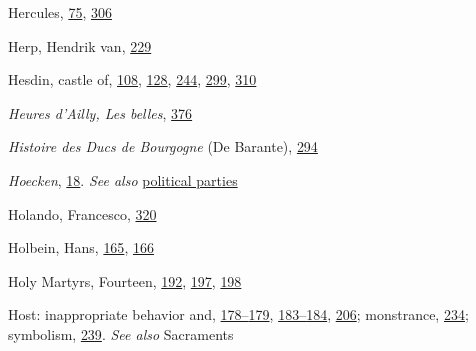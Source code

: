 Hercules,
\protect\hyperlink{10_Chapter_Three__THE_HEROIC_DREAM.xhtmlux5cux23page_75}{75},
\protect\hyperlink{20_ILLUSTRATIONS_FOLLOW_PAGE.xhtmlux5cux23page_306}{306}

Herp, Hendrik van,
\protect\hyperlink{15_Chapter_Eight__RELIGIOUS_EXCITAT.xhtmlux5cux23page_229}{229}

Hesdin, castle of,
\protect\hyperlink{10_Chapter_Three__THE_HEROIC_DREAM.xhtmlux5cux23page_108}{108},
\protect\hyperlink{11_Chapter_Four__THE_FORMS_OF_LOVE.xhtmlux5cux23page_128}{128},
\protect\hyperlink{16_Chapter_Nine__THE_DECLINE_OF_SYM.xhtmlux5cux23page_244}{244},
\protect\hyperlink{20_ILLUSTRATIONS_FOLLOW_PAGE.xhtmlux5cux23page_299}{299},
\protect\hyperlink{20_ILLUSTRATIONS_FOLLOW_PAGE.xhtmlux5cux23page_310}{310}

\emph{Heures d'Ailly, Les belles},
\protect\hyperlink{21_Chapter_Thirteen__IMAGE_AND_WORD.xhtmlux5cux23page_376}{376}

\emph{Histoire des Ducs de Bourgogne} (De Barante),
\protect\hyperlink{19_Chapter_Twelve__ART_IN_LIFE.xhtmlux5cux23page_294}{294}

\emph{Hoecken},
\protect\hyperlink{08_Chapter_One__THE_PASSIONATE_INTE.xhtmlux5cux23page_18}{18}.
\emph{See also}
\protect\hyperlink{25_INDEX.xhtmlux5cux23id_2265}{political parties}

Holando, Francesco,
\protect\hyperlink{20_ILLUSTRATIONS_FOLLOW_PAGE.xhtmlux5cux23page_320}{320}

Holbein, Hans,
\protect\hyperlink{12_Chapter_Five__THE_VISION_OF_DEAT.xhtmlux5cux23page_165}{165},
\protect\hyperlink{12_Chapter_Five__THE_VISION_OF_DEAT.xhtmlux5cux23page_166}{166}

Holy Martyrs, Fourteen,
\protect\hyperlink{13_Chapter_Six__THE_DEPICTION_OF_TH.xhtmlux5cux23page_192}{192},
\protect\hyperlink{13_Chapter_Six__THE_DEPICTION_OF_TH.xhtmlux5cux23page_197}{197},
\protect\hyperlink{13_Chapter_Six__THE_DEPICTION_OF_TH.xhtmlux5cux23page_198}{198}

Host: inappropriate behavior and,
\protect\hyperlink{13_Chapter_Six__THE_DEPICTION_OF_TH.xhtmlux5cux23page_178}{178--}\protect\hyperlink{13_Chapter_Six__THE_DEPICTION_OF_TH.xhtmlux5cux23page_179}{179},
\protect\hyperlink{13_Chapter_Six__THE_DEPICTION_OF_TH.xhtmlux5cux23page_183}{183--}\protect\hyperlink{13_Chapter_Six__THE_DEPICTION_OF_TH.xhtmlux5cux23page_184}{184},
\protect\hyperlink{14_Chapter_Seven__THE_PIOUS_PERSONA.xhtmlux5cux23page_206}{206};
monstrance,
\protect\hyperlink{16_Chapter_Nine__THE_DECLINE_OF_SYM.xhtmlux5cux23page_234}{234};
symbolism,
\protect\hyperlink{16_Chapter_Nine__THE_DECLINE_OF_SYM.xhtmlux5cux23page_239}{239}.
\emph{See also} Sacraments

